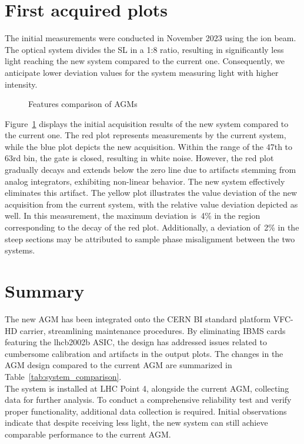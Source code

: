 \section{First acquired plots}
The initial measurements were conducted in November 2023 using the ion beam.
The optical system divides the SL in a 1:8 ratio, resulting in significantly
less light reaching the new system compared to the current one. Consequently,
we anticipate lower deviation values for the system measuring light with higher
intensity.
\begin{figure}[!htb]
    \begin{center}
        \scalebox{0.54}{}
        \caption{Features comparison of AGMs}
        \label{fig:comparison_chart}
    \end{center}
\end{figure}
Figure~\ref{fig:comparison_chart} displays the initial acquisition results of
the new system compared to the current one. The red plot represents
measurements by the current system, while the blue plot depicts the new
acquisition. Within the range of the 47th to 63rd bin, the gate is closed,
resulting in white noise. However, the red plot gradually decays and extends
below the zero line due to artifacts stemming from analog integrators,
exhibiting non-linear behavior. The new system effectively eliminates this
artifact. The yellow plot illustrates the value deviation of the new
acquisition from the current system, with the relative value deviation depicted
as well. In this measurement, the maximum deviation is~4\% in the region
corresponding to the decay of the red plot. Additionally, a deviation of~2\% in
the steep sections may be attributed to sample phase misalignment between the
two systems.

\section{Summary}
The new AGM has been integrated onto the CERN BI standard platform VFC-HD
carrier, streamlining maintenance procedures. By eliminating IBMS cards
featuring the lhcb2002b ASIC, the design has addressed issues related to
cumbersome calibration and artifacts in the output plots. The changes in the
AGM design compared to the current AGM are summarized in
Table~\ref{tab:system_comparison}.\\
The system is installed at LHC Point 4, alongside the current AGM, collecting
data for further analysis. To conduct a comprehensive reliability test and
verify proper functionality, additional data collection is required. Initial
observations indicate that despite receiving less light, the new system can
still achieve comparable performance to the current AGM.
 





